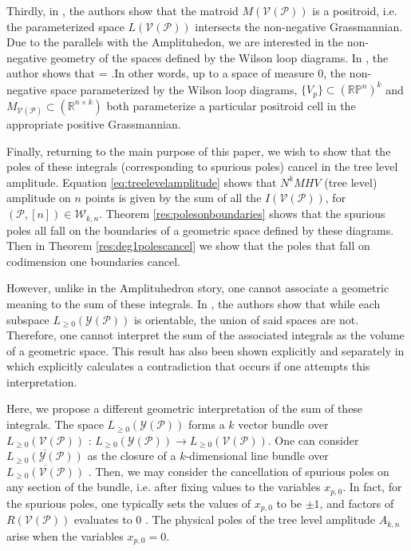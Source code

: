 \documentclass[11pt]{article}
\newcommand{\R}{\mathbb{R}}
\newcommand{\RP}{\mathbb{R}\mathbb{P}}
\def\ba #1\ea{\begin{align} #1 \end{align}}
\newcommand{\cP}{\mathcal{P}}
\newcommand{\cV}{\mathcal{V}}
\newcommand{\cY}{\mathcal{Y}}
\newcommand{\VP}{\cV(\cP)}
\newcommand{\YP}{\cY(\cP)}
\newcommand{\Sigmapos}{\Sigma_{\geq 0}}
\newcommand{\Lpos}{L_{\geq 0}}
\newcommand{\cW}{\mathcal{W}}
\theoremstyle{remark}
\theoremstyle{definition}
\begin{document}
Thirdly, in \cite{Wilsonloop}, the authors show that the matroid $M(\VP)$ is a positroid, i.e. the parameterized space $L(\VP)$ intersects the non-negative Grassmannian. Due to the parallels with the Amplituhedon, we are interested in the non-negative geometry of the spaces defined by the Wilson loop diagrams. In \cite{basisshapeloci}, the author shows that \ba \overline{\Lpos(\VP)} = \overline{\Sigmapos(\VP)} \label{eq:density}\;.\ea  In other words, up to a space of measure $0$, the non-negative space parameterized by the Wilson loop diagrams, $\{V_p\} \subset (\RP^{n})^k$ and $M_{\VP} \subset (\R^{n \times k})$ both parameterize a particular positroid cell in the appropriate positive Grassmannian. 

Finally, returning to the main purpose of this paper, we wish to show that  the poles of these integrals (corresponding to spurious poles) cancel in the tree level amplitude. Equation \eqref{eq:treelevelamplitude} shows that $N^kMHV$ (tree level) amplitude on $n$ points is given by the sum of all the $I(\VP)$, for $(\cP, [n]) \in \cW_{k,n}$. Theorem \ref{res:polesonboundaries} shows that the spurious poles all fall on the boundaries of a geometric space defined by these diagrams. Then in Theorem \ref{res:deg1polescancel} we show that the poles that fall on codimension one boundaries cancel.

However, unlike in the Amplituhedron story, one cannot associate a geometric meaning to the sum of these integrals. In \cite{non-orientable}, the authors show that while each subspace $\Lpos(\YP)$ is orientable, the union of said spaces are not. Therefore, one cannot interpret the sum of the associated integrals as the volume of a geometric space. This result has also been shown explicitly and separately in \cite{HeslopStewart} which explicitly calculates a contradiction that occurs if one attempts this interpretation.

Here, we propose a different geometric interpretation of the sum of these integrals. The space $\Lpos(\YP)$ forms a $k$ vector bundle over $\Lpos(\VP)$ \cite{non-orientable}: $\Lpos(\YP) \rightarrow \Lpos(\VP)$. One can consider $\overline{\Lpos(\YP)}$ as the closure of a $k$-dimensional line bundle over $\overline{\Lpos(\VP)}$ \cite{non-orientable}. Then, we may consider the cancellation of spurious poles on any section of the bundle, i.e. after fixing values to the variables $x_{p, 0}$. In fact, for the spurious poles, one typically sets the values of $x_{p,0}$ to be $\pm 1$, and factors of $R(\VP)$ evaluates to $0$ \cite{casestudy, HeslopStewart, Amplituhedronsquared}. The physical poles of the tree level amplitude $A_{k,n}$ arise when the variables $x_{p, 0} = 0$. 
\end{document}
